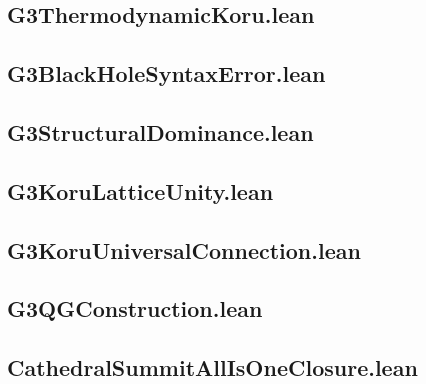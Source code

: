 \documentclass[11pt,a4paper]{article}
\theoremstyle{definition}
\theoremstyle{remark}
\begin{document}
\subsection{G3ThermodynamicKoru.lean}


\subsection{G3BlackHoleSyntaxError.lean}


\subsection{G3StructuralDominance.lean}


\subsection{G3KoruLatticeUnity.lean}


\subsection{G3KoruUniversalConnection.lean}


\subsection{G3QGConstruction.lean}


\subsection{CathedralSummitAllIsOneClosure.lean}

\end{document}
